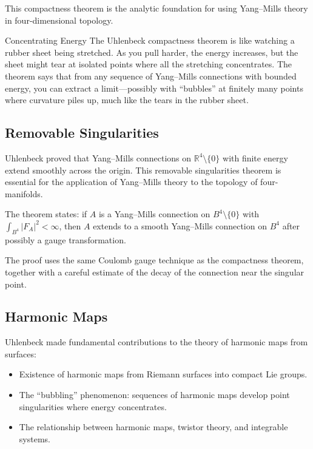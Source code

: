 This compactness theorem is the analytic foundation for using Yang--Mills theory in four-dimensional topology.

\begin{analogy}{Concentrating Energy}
The Uhlenbeck compactness theorem is like watching a rubber sheet
being stretched. As you pull harder, the energy increases, but the
sheet might tear at isolated points where all the stretching
concentrates. The theorem says that from any sequence of Yang--Mills
connections with bounded energy, you can extract a limit---possibly
with ``bubbles'' at finitely many points where curvature piles up,
much like the tears in the rubber sheet.
\end{analogy}

\subsection{Removable Singularities}

Uhlenbeck proved that Yang--Mills connections on $\mathbb{R}^4 \setminus \{0\}$ with finite energy extend smoothly across the origin. This removable singularities theorem is essential for the application of Yang--Mills theory to the topology of four-manifolds.

The theorem states: if $A$ is a Yang--Mills connection on $B^4 \setminus \{0\}$ with $\int_{B^4} |F_A|^2 < \infty$, then $A$ extends to a smooth Yang--Mills connection on $B^4$ after possibly a gauge transformation.

The proof uses the same Coulomb gauge technique as the compactness theorem, together with a careful estimate of the decay of the connection near the singular point.

\subsection{Harmonic Maps}

Uhlenbeck made fundamental contributions to the theory of harmonic maps from surfaces:
\begin{itemize}
\item Existence of harmonic maps from Riemann surfaces into compact Lie groups.
\item The ``bubbling'' phenomenon: sequences of harmonic maps develop point singularities where energy concentrates.
\item The relationship between harmonic maps, twistor theory, and integrable systems.
\end{itemize}

